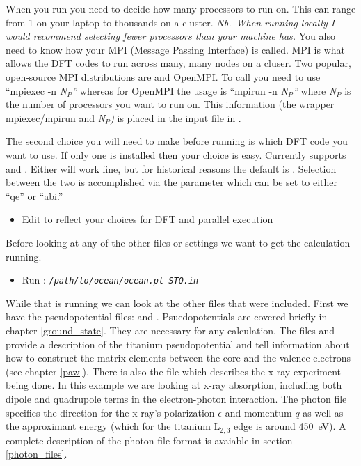 \documentclass[11pt]{report}
\begin{document}
When you run  you need to decide how many processors to run on. This can range from 1 on your laptop to thousands on a cluster. {\it Nb.\ When running locally I would recommend selecting fewer processors than your machine has.} You also need to know how your MPI (Message Passing Interface) is called. MPI is what allows the DFT codes to run across many, many nodes on a cluser. Two popular, open-source MPI distributions are  and OpenMPI. To call  you need to use ``mpiexec -n {\it N$_P$''} whereas for OpenMPI the usage is ``mpirun -n {\it N$_P$''} where {\it N$_P$} is the number of processors you want to run on. This information (the wrapper mpiexec/mpirun and {\it N$_P$)} is placed in the input file in .

The second choice you will need to make before running is which DFT code you want to use. If only one is installed then your choice is easy. Currently  supports  and . Either will work fine, but for historical reasons the default is . Selection between the two is accomplished via the   parameter which can be set to either ``qe'' or ``abi.''
\begin{itemize}
\item Edit  to reflect your choices for DFT and parallel execution
\end{itemize}
Before looking at any of the other files or settings we want to get the calculation running. 
\begin{itemize}
\item Run : \texttt{\textsl{/path/to/ocean/ocean.pl STO.in}}
\end{itemize}
While that is running we can look at the other files that were included. First we have the pseudopotential files:  and . Psuedopotentials are covered briefly in chapter \ref{ground_state}. They are necessary for any  calculation. The files  and  provide a description of the titanium pseudopotential and tell  information about how to construct the matrix elements between the core and the valence electrons (see chapter \ref{paw}). There is also the file  which describes the x-ray experiment being done. In this example we are looking at x-ray absorption, including both dipole and quadrupole terms in the electron-photon interaction. The photon file specifies the direction for the x-ray's polarization $\epsilon$ and momentum $q$ as well as the 
approximant energy (which for the titanium L$_{2,3}$ edge is around 450~eV). A complete description of the photon file format is avaiable in section \ref{photon_files}.
\end{document}
